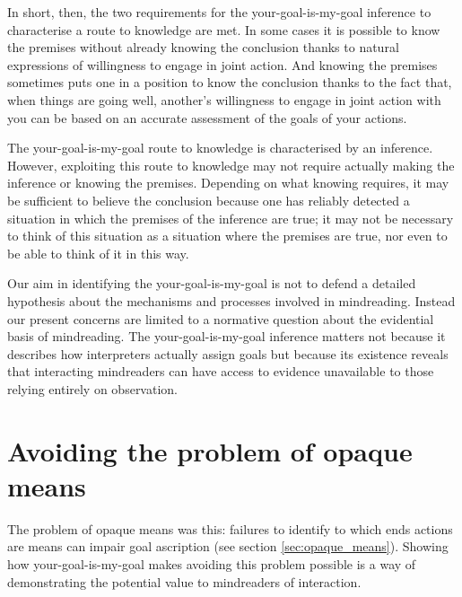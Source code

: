 \documentclass[14pt,a4paper]{extarticle}
\begin{document}
In short, then, the two requirements for the your-goal-is-my-goal inference to characterise a route to knowledge are met.  
In some cases it is possible to know the premises without already knowing the conclusion thanks to natural expressions of willingness to engage in joint action.  
And knowing the premises sometimes puts one in a position to know the conclusion thanks to the fact that, when things are going well, another's willingness to engage in joint action with you can be based on an accurate assessment of the goals of your actions.

The your-goal-is-my-goal route to knowledge is characterised by an inference.  
However, exploiting this route to knowledge may not require actually making the inference or knowing the premises.  
Depending on what knowing requires,
it may be sufficient to believe the conclusion because one has reliably detected a situation in which the premises of the inference are true;
it may not be necessary to think of this situation as a situation where the premises are true,
nor even to be able to think of it in this way.

Our aim in identifying the your-goal-is-my-goal is not to 
defend a detailed hypothesis about the mechanisms and processes involved in mindreading.
Instead our present concerns are limited to a normative question about the evidential basis of mindreading.
The your-goal-is-my-goal inference matters
not because it describes how interpreters actually assign goals
but because 
its existence reveals that interacting mindreaders can have access to evidence unavailable to those relying entirely on observation.
 

\section{Avoiding the problem of opaque means}

The problem of opaque means was this:
 failures to identify to which ends actions are means can impair goal ascription (see section \vref{sec:opaque_means}).
Showing how your-goal-is-my-goal makes  avoiding this problem possible is a way of demonstrating the potential value  to mindreaders of interaction. 
\end{document}
